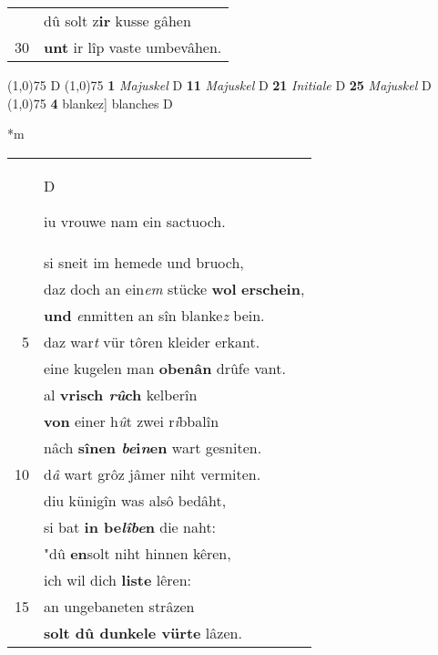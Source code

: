 \documentclass[8pt,a4paper,notitlepage]{article}
\begin{document}
\begin{table}[ht]
\begin{minipage}[t]{0.5\linewidth}
\begin{tabular}{rl}
 & dû solt z\textbf{ir} kusse gâhen\\ 
30 & \textbf{unt} ir lîp vaste umbevâhen.\\ 
\end{tabular}
\scriptsize
\line(1,0){75} \newline
D \newline
\line(1,0){75} \newline
\textbf{1} \textit{Majuskel} D  \textbf{11} \textit{Majuskel} D  \textbf{21} \textit{Initiale} D  \textbf{25} \textit{Majuskel} D  \newline
\line(1,0){75} \newline
\textbf{4} blankez] blanches D \newline
\end{minipage}
\hspace{0.5cm}
\begin{minipage}[t]{0.5\linewidth}
\small
\begin{center}*m
\end{center}
\begin{tabular}{rl}
 & \begin{large}D\end{large}iu vrouwe nam ein sactuoch.\\ 
 & si sneit im hemede und bruoch,\\ 
 & daz doch an ein\textit{em} stücke \textbf{wol} \textbf{erschein},\\ 
 & \textbf{und} \textit{e}nmitten an sîn blanke\textit{z} bein.\\ 
5 & daz war\textit{t} vür tôren kleider erkant.\\ 
 & eine kugelen man \textbf{obenân} drûfe vant.\\ 
 & al \textbf{vrisch \textit{rû}ch} kelberîn\\ 
 & \textbf{von} einer h\textit{û}t zwei r\textit{i}bbalîn\\ 
 & nâch \textbf{sînen \textit{be}i\textit{n}en} wart gesniten.\\ 
10 & d\textit{â} wart grôz jâmer niht vermiten.\\ 
 & diu künigîn was alsô bedâht,\\ 
 & si bat \textbf{in be\textit{lîbe}n} die naht:\\ 
 & "dû \textbf{en}solt niht hinnen kêren,\\ 
 & ich wil dich \textbf{liste} lêren:\\ 
15 & an ungebaneten strâzen\\ 
 & \textbf{solt dû dunkele vürte} lâzen.\\ 

\end{tabular}
\end{minipage}
\end{table}
\end{document}
